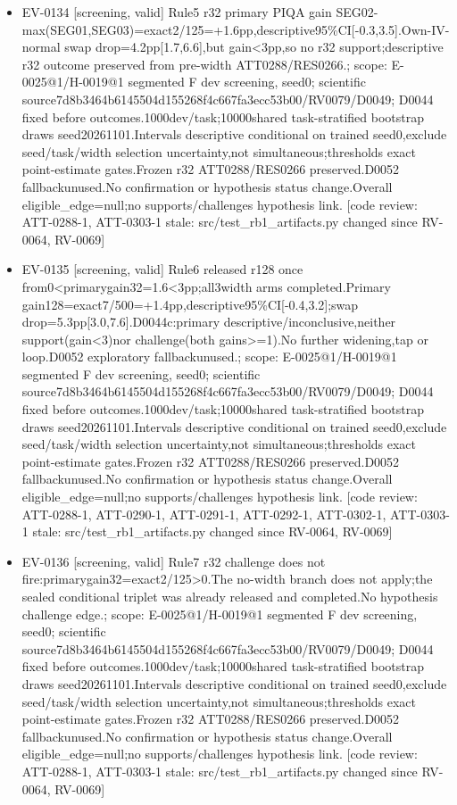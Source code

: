 \documentclass[11pt]{article}
\begin{document}
\begin{itemize}
\item EV-0134 [screening, valid] Rule5 r32 primary PIQA gain SEG02-max(SEG01,SEG03)=exact2/125=+1.6pp,descriptive95\%CI[-0.3,3.5].Own-IV-normal swap drop=4.2pp[1.7,6.6],but gain\textless{}3pp,so no r32 support;descriptive r32 outcome preserved from pre-width ATT0288/RES0266.; scope: E-0025@1/H-0019@1 segmented F dev screening, seed0; scientific source7d8b3464b6145504d155268f4c667fa3ecc53b00/RV0079/D0049; D0044 fixed before outcomes.1000dev/task;10000shared task-stratified bootstrap draws seed20261101.Intervals descriptive conditional on trained seed0,exclude seed/task/width selection uncertainty,not simultaneous;thresholds exact point-estimate gates.Frozen r32 ATT0288/RES0266 preserved.D0052 fallbackunused.No confirmation or hypothesis status change.Overall eligible\_edge=null;no supports/challenges hypothesis link. [code review: ATT-0288-1, ATT-0303-1 stale: src/test\_rb1\_artifacts.py changed since RV-0064, RV-0069]
\item EV-0135 [screening, valid] Rule6 released r128 once from0\textless{}primarygain32=1.6\textless{}3pp;all3width arms completed.Primary gain128=exact7/500=+1.4pp,descriptive95\%CI[-0.4,3.2];swap drop=5.3pp[3.0,7.6].D0044c:primary descriptive/inconclusive,neither support(gain\textless{}3)nor challenge(both gains\textgreater{}=1).No further widening,tap or loop.D0052 exploratory fallbackunused.; scope: E-0025@1/H-0019@1 segmented F dev screening, seed0; scientific source7d8b3464b6145504d155268f4c667fa3ecc53b00/RV0079/D0049; D0044 fixed before outcomes.1000dev/task;10000shared task-stratified bootstrap draws seed20261101.Intervals descriptive conditional on trained seed0,exclude seed/task/width selection uncertainty,not simultaneous;thresholds exact point-estimate gates.Frozen r32 ATT0288/RES0266 preserved.D0052 fallbackunused.No confirmation or hypothesis status change.Overall eligible\_edge=null;no supports/challenges hypothesis link. [code review: ATT-0288-1, ATT-0290-1, ATT-0291-1, ATT-0292-1, ATT-0302-1, ATT-0303-1 stale: src/test\_rb1\_artifacts.py changed since RV-0064, RV-0069]
\item EV-0136 [screening, valid] Rule7 r32 challenge does not fire:primarygain32=exact2/125\textgreater{}0.The no-width branch does not apply;the sealed conditional triplet was already released and completed.No hypothesis challenge edge.; scope: E-0025@1/H-0019@1 segmented F dev screening, seed0; scientific source7d8b3464b6145504d155268f4c667fa3ecc53b00/RV0079/D0049; D0044 fixed before outcomes.1000dev/task;10000shared task-stratified bootstrap draws seed20261101.Intervals descriptive conditional on trained seed0,exclude seed/task/width selection uncertainty,not simultaneous;thresholds exact point-estimate gates.Frozen r32 ATT0288/RES0266 preserved.D0052 fallbackunused.No confirmation or hypothesis status change.Overall eligible\_edge=null;no supports/challenges hypothesis link. [code review: ATT-0288-1, ATT-0303-1 stale: src/test\_rb1\_artifacts.py changed since RV-0064, RV-0069]

\end{itemize}
\end{document}
